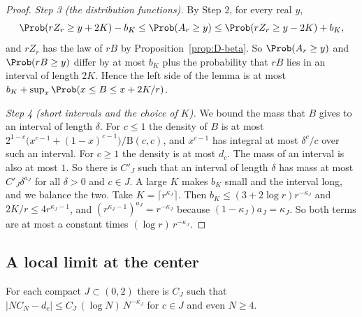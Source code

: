 \begin{proof}
\emph{Step 3 (the distribution functions).} By Step 2, for every real $y$,
\[
\Prob(rZ_r\ge y+2K)-b_K\le\Prob(A_r\ge y)\le\Prob(rZ_r\ge y-2K)+b_K ,
\]
and $rZ_r$ has the law of $rB$ by Proposition~\ref{prop:D-beta}. So
$\Prob(A_r\ge y)$ and $\Prob(rB\ge y)$ differ by at most $b_K$ plus the
probability that $rB$ lies in an interval of length $2K$. Hence the left
side of the lemma is at most $b_K+\sup_x\Prob(x\le B\le x+2K/r)$.

\emph{Step 4 (short intervals and the choice of $K$).} We bound the mass
that $B$ gives to an interval of length $\delta$. For $c\le1$ the density of
$B$ is at most $2^{1-c}\bigl(x^{c-1}+(1-x)^{c-1}\bigr)/\mathrm B(c,c)$, and
$x^{c-1}$ has integral at most $\delta^c/c$ over such an interval. For
$c\ge1$ the density is at most $d_c$. The mass of an interval is also at
most $1$. So there is $C'_J$ such that an interval of length $\delta$ has
mass at most $C'_J\delta^{a_J}$ for all $\delta>0$ and $c\in J$. A large $K$
makes $b_K$ small and the interval long, and we balance the two. Take
$K=\lceil r^{\kappa_J}\rceil$. Then $b_K\le(3+2\log r)r^{-\kappa_J}$ and
$2K/r\le4r^{\kappa_J-1}$, and $(r^{\kappa_J-1})^{a_J}=r^{-\kappa_J}$ because
$(1-\kappa_J)a_J=\kappa_J$. So both terms are at most a constant times
$(\log r)\,r^{-\kappa_J}$.
\end{proof}

\subsection{A local limit at the center}

\begin{proposition}\label{prop:D-llt}
For each compact $J\subset(0,2)$ there is $C_J$ such that
$\bigl\lvert NC_N-d_c\bigr\rvert\le C_J\,(\log N)\,N^{-\kappa_J}$ for $c\in J$
and even $N\ge4$.
\end{proposition}

